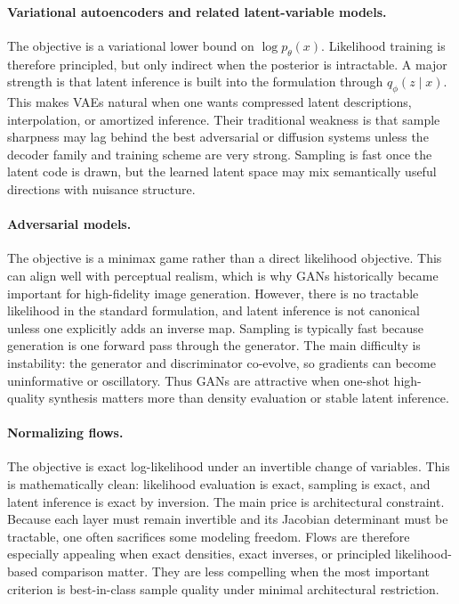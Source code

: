 \paragraph{Variational autoencoders and related latent-variable models.}
The objective is a variational lower bound on $\log p_\theta(x)$.
Likelihood training is therefore principled, but only indirect when the posterior is intractable.
A major strength is that latent inference is built into the formulation through $q_\phi(z\mid x)$.
This makes VAEs natural when one wants compressed latent descriptions, interpolation, or amortized inference.
Their traditional weakness is that sample sharpness may lag behind the best adversarial or diffusion systems unless the decoder family and training scheme are very strong.
Sampling is fast once the latent code is drawn, but the learned latent space may mix semantically useful directions with nuisance structure.

\paragraph{Adversarial models.}
The objective is a minimax game rather than a direct likelihood objective.
This can align well with perceptual realism, which is why GANs historically became important for high-fidelity image generation.
However, there is no tractable likelihood in the standard formulation, and latent inference is not canonical unless one explicitly adds an inverse map.
Sampling is typically fast because generation is one forward pass through the generator.
The main difficulty is instability: the generator and discriminator co-evolve, so gradients can become uninformative or oscillatory.
Thus GANs are attractive when one-shot high-quality synthesis matters more than density evaluation or stable latent inference.

\paragraph{Normalizing flows.}
The objective is exact log-likelihood under an invertible change of variables.
This is mathematically clean: likelihood evaluation is exact, sampling is exact, and latent inference is exact by inversion.
The main price is architectural constraint.
Because each layer must remain invertible and its Jacobian determinant must be tractable, one often sacrifices some modeling freedom.
Flows are therefore especially appealing when exact densities, exact inverses, or principled likelihood-based comparison matter.
They are less compelling when the most important criterion is best-in-class sample quality under minimal architectural restriction.

